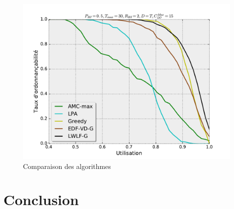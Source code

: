 \documentclass[12pt,a4paper,oneside]{book}
\theoremstyle{break}
\theoremstyle{breakplain}
\begin{document}
\begin{figure}[h]
\includegraphics[width=\textwidth]{./results/perfComp.pdf}
\caption{Comparaison des algorithmes}
\end{figure}



\chapter{Conclusion}




%

\end{document}
